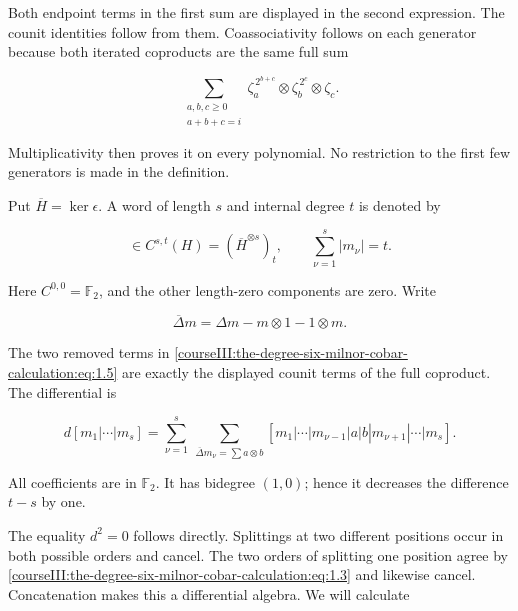 Both endpoint terms in the first sum are displayed in the second expression. The counit identities follow from them. Coassociativity follows on each generator because both iterated coproducts are the same full sum

\begin{equation}
\sum_{\substack{a,b,c\geq0\\a+b+c=i}}
 \zeta_a^{\,2^{b+c}}\otimes
 \zeta_b^{\,2^c}\otimes\zeta_c .
 \label{courseIII:the-degree-six-milnor-cobar-calculation:eq:1.3}
\end{equation}

Multiplicativity then proves it on every polynomial. No restriction to the first few generators is made in the definition.

Put \(\overline H=\ker\epsilon\). A word of length \(s\) and internal degree \(t\) is denoted by

\begin{equation}
[m_1|\cdots|m_s]\in C^{s,t}(H)
   =(\overline H^{\otimes s})_t,\qquad
 \sum_{\nu=1}^{s}|m_\nu|=t .
 \label{courseIII:the-degree-six-milnor-cobar-calculation:eq:1.4}
\end{equation}

Here \(C^{0,0}=\mathbb F _2\), and the other length-zero components are zero. Write

\begin{equation}
\overline\Delta m=\Delta m-m\otimes1-1\otimes m.
 \label{courseIII:the-degree-six-milnor-cobar-calculation:eq:1.5}
\end{equation}

The two removed terms in \eqref{courseIII:the-degree-six-milnor-cobar-calculation:eq:1.5} are exactly the displayed counit terms of the full coproduct. The differential is

\begin{equation}
d[m_1|\cdots|m_s]
 =\sum_{\nu=1}^{s}\ \sum_{\overline\Delta m_\nu
                       =\sum a\otimes b}
 [m_1|\cdots|m_{\nu-1}|a|b|m_{\nu+1}|\cdots|m_s].
 \label{courseIII:the-degree-six-milnor-cobar-calculation:eq:1.6}
\end{equation}

All coefficients are in \(\mathbb F _2\). It has bidegree \((1,0)\); hence it decreases the difference \(t-s\) by one.

The equality \(d^2=0\) follows directly. Splittings at two different positions occur in both possible orders and cancel. The two orders of splitting one position agree by \eqref{courseIII:the-degree-six-milnor-cobar-calculation:eq:1.3} and likewise cancel. Concatenation makes this a differential algebra. We will calculate

